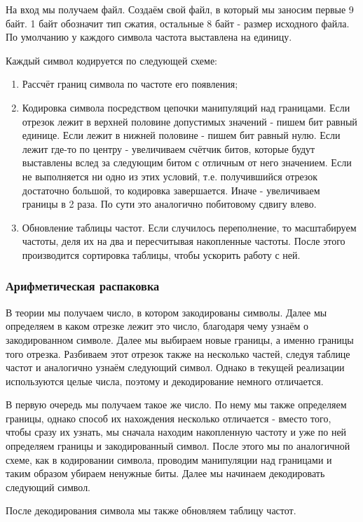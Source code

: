 \documentclass[12pt]{article}
\begin{document}
На вход мы получаем файл. Создаём свой файл, в который мы заносим первые 9 байт. 1 байт обозначит тип сжатия, остальные 8 байт - размер исходного файла. По умолчанию у каждого символа частота выставлена на единицу.

Каждый символ кодируется по следующей схеме:

\begin{enumerate}
    \item Рассчёт границ символа по частоте его появления;
    \item Кодировка символа посредством цепочки манипуляций над границами. Если отрезок лежит в верхней половине допустимых значений - пишем бит равный единице. Если лежит в нижней половине - пишем бит равный нулю. Если лежит где-то по центру - увеличиваем счётчик битов, которые будут выставлены вслед за следующим битом с отличным от него значением. Если не выполняется ни одно из этих условий, т.е. получившийся отрезок достаточно большой, то кодировка завершается. Иначе - увеличиваем границы в 2 раза. По сути это аналогично побитовому сдвигу влево.
    \item Обновление таблицы частот. Если случилось переполнение, то масштабируем частоты, деля их на два и пересчитывая накопленные частоты. После этого производится сортировка таблицы, чтобы ускорить работу с ней.
\end{enumerate}
\subsubsection*{Арифметическая распаковка}
В теории мы получаем число, в котором закодированы символы. Далее мы определяем в каком отрезке лежит это число, благодаря чему узнаём о закодированном символе. Далее мы выбираем новые границы, а именно границы того отрезка. Разбиваем этот отрезок также на несколько частей, следуя таблице частот и аналогично узнаём следующий символ. Однако в текущей реализации используются целые числа, поэтому и декодирование немного отличается.

В первую очередь мы получаем такое же число. По нему мы также определяем границы, однако способ их нахождения несколько отличается - вместо того, чтобы сразу их узнать, мы сначала находим накопленную частоту и уже по ней определяем границы и закодированный символ. После этого мы по аналогичной схеме, как в кодировании символа, проводим манипуляции над границами и таким образом убираем ненужные биты. Далее мы начинаем декодировать следующий символ.

После декодирования символа мы также обновляем таблицу частот.
\end{document}

